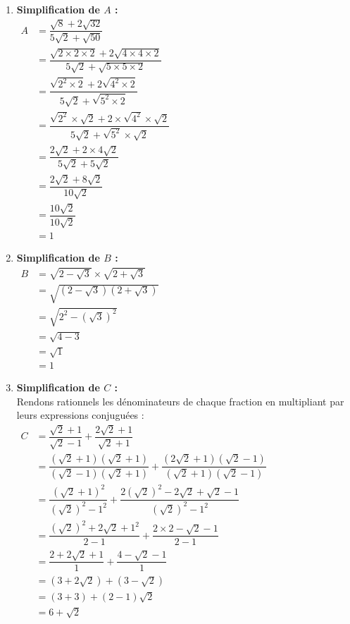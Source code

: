 \documentclass[12pt,a4paper]{article}
\begin{document}
\begin{enumerate}
    \item \textbf{Simplification de $A$ :} \\
    $
    \begin{aligned}
    A &= \dfrac{\sqrt{8} + 2\sqrt{32}}{5\sqrt{2} + \sqrt{50}} \\[0.2cm]
    &= \dfrac{\sqrt{2 \times 2 \times 2} + 2\sqrt{4 \times 4 \times 2}}{5\sqrt{2} + \sqrt{5 \times 5 \times 2}} \\[0.2cm]
    &= \dfrac{\sqrt{2^2 \times 2} + 2\sqrt{4^2 \times 2}}{5\sqrt{2} + \sqrt{5^2 \times 2}} \\[0.2cm]
    &= \dfrac{\sqrt{2^2} \times \sqrt{2} + 2 \times \sqrt{4^2} \times \sqrt{2}}{5\sqrt{2} + \sqrt{5^2} \times \sqrt{2}} \\[0.2cm]
    &= \dfrac{2\sqrt{2} + 2 \times 4\sqrt{2}}{5\sqrt{2} + 5\sqrt{2}} \\[0.2cm]
    &= \dfrac{2\sqrt{2} + 8\sqrt{2}}{10\sqrt{2}} \\[0.2cm]
    &= \dfrac{10\sqrt{2}}{10\sqrt{2}} \\[0.2cm]
    &= 1
    \end{aligned}
    $

    \item \textbf{Simplification de $B$ :} \\
    $
    \begin{aligned}
    B &= \sqrt{2 - \sqrt{3}} \times \sqrt{2 + \sqrt{3}} \\
    &= \sqrt{(2 - \sqrt{3})(2 + \sqrt{3})} \\
    &= \sqrt{2^2 - (\sqrt{3})^2} \\
    &= \sqrt{4 - 3} \\
    &= \sqrt{1} \\
    &= 1
    \end{aligned}
    $

    \item \textbf{Simplification de $C$ :} \\
    Rendons rationnels les dénominateurs de chaque fraction en multipliant par leurs expressions conjuguées : \\
    $
    \begin{aligned}
    C &= \dfrac{\sqrt{2} + 1}{\sqrt{2} - 1} + \dfrac{2\sqrt{2} + 1}{\sqrt{2} + 1} \\[0.2cm]
    &= \dfrac{(\sqrt{2} + 1)(\sqrt{2} + 1)}{(\sqrt{2} - 1)(\sqrt{2} + 1)} + \dfrac{(2\sqrt{2} + 1)(\sqrt{2} - 1)}{(\sqrt{2} + 1)(\sqrt{2} - 1)} \\[0.2cm]
    &= \dfrac{(\sqrt{2} + 1)^2}{(\sqrt{2})^2 - 1^2} + \dfrac{2(\sqrt{2})^2 - 2\sqrt{2} + \sqrt{2} - 1}{(\sqrt{2})^2 - 1^2} \\[0.2cm]
    &= \dfrac{(\sqrt{2})^2 + 2\sqrt{2} + 1^2}{2 - 1} + \dfrac{2 \times 2 - \sqrt{2} - 1}{2 - 1} \\[0.2cm]
    &= \dfrac{2 + 2\sqrt{2} + 1}{1} + \dfrac{4 - \sqrt{2} - 1}{1} \\[0.2cm]
    &= (3 + 2\sqrt{2}) + (3 - \sqrt{2}) \\
    &= (3 + 3) + (2 - 1)\sqrt{2} \\
    &= 6 + \sqrt{2}
    \end{aligned}
    $
\end{enumerate}
\end{document}
